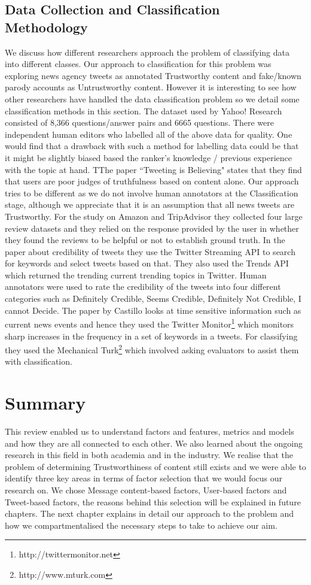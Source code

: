 \subsection{Data Collection and Classification Methodology}
We discuss how different researchers approach the problem of classifying data into different classes. Our approach to classification for this problem was exploring news agency tweets as annotated Trustworthy content and fake/known parody accounts as Untrustworthy content. However it is interesting to see how other researchers have handled the data classification problem so we detail some classification methods in this section. The dataset used by Yahoo! Research consisted of 8,366 questions/answer pairs and 6665 questions. There were independent human editors who labelled all of the above data for quality. One would find that a drawback with such a method for labelling data could be that it might be slightly biased based the ranker's knowledge / previous experience with the topic at hand. TThe paper ``Tweeting is Believing"\cite{17} states that they find that users are poor judges of truthfulness based on content alone. Our approach tries to be different as we do not involve human annotators at the Classification stage, although we appreciate that it is an assumption that all news tweets are Trustworthy. For the study on Amazon and TripAdvisor they collected four large review datasets and they relied on the response provided by the user in whether they found the reviews to be helpful or not to establish ground truth. In the paper about credibility of tweets \cite{11} they use the Twitter Streaming API to search for keywords and select tweets based on that. They also used the Trends API which returned the trending current trending topics in Twitter. Human annotators were used to rate the credibility of the tweets into four different categories such as Definitely Credible, Seems Credible, Definitely Not Credible, I cannot Decide. The paper by Castillo \cite{12} looks at time sensitive information such as current news events and hence they used the Twitter Monitor\footnote{http://twittermonitor.net} which monitors sharp increases in the frequency in a set of keywords in a tweets. For classifying they used the Mechanical Turk\footnote{http://www.mturk.com} which involved asking evaluators to assist them with classification. 
\section{Summary}
This review enabled us to understand factors and features, metrics and models and how they are all connected to each other. We also learned about the ongoing research in this field in both academia and in the industry. We realise that the problem of determining Trustworthiness of content still exists and we were able to identify three key areas in terms of factor selection that we would focus our research on.  We chose Message content-based factors, User-based factors and Tweet-based factors, the reasons behind this selection will be explained in future chapters. The next chapter explains in detail our approach to the problem and how we compartmentalised the  necessary steps to take to achieve our aim.  




